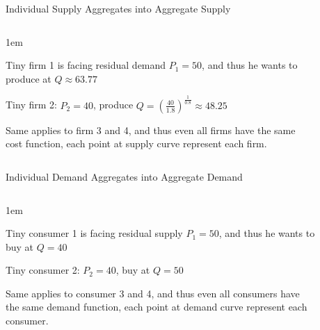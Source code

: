 \documentclass[11pt,aspectratio=43,usenames,dvipsnames]{beamer}
\let\olditemize=\itemize
\let\endolditemize=\enditemize
\renewenvironment{itemize}{\olditemize \itemsep1em}{\endolditemize}
\theoremstyle{definition}
\begin{document}
\begin{frame}{Individual Supply Aggregates into Aggregate Supply}
\label{slide:Individual_Supply_Aggregation_into_Aggregate_Supply}
    \begin{columns}
        \begin{column}{0.45\textwidth}
            \begin{itemize}
                \item \alert{Tiny} firm 1 is facing residual demand $ P_{1} = 50 $, and thus he wants to produce at $ Q \approx 63.77 $
                \item \alert{Tiny} firm 2: $ P_{2} = 40$, produce $Q = ( \frac{40}{1.8} )^{ \frac{1}{0.8}} \approx 48.25$
                \item Same applies to firm 3 and 4, and thus even all firms have the same cost function, \alert{each point at supply curve represent each firm}.
            \end{itemize}

        \end{column}
        \begin{column}{0.6\textwidth}
            \begin{figure}
                \centering
                
            \end{figure}
        \end{column}
    \end{columns}

\end{frame}

\begin{frame}{Individual Demand Aggregates into Aggregate Demand}
\label{slide:Individual_Demand_Aggregates_into_Aggregate_Demand}
    \begin{columns}
        \begin{column}{0.45\textwidth}
            \begin{itemize}
                \item \alert{Tiny} \alert{consumer} 1 is facing residual supply $ P_{1} = 50 $, and thus he wants to buy at $ Q = 40$
                \item \alert{Tiny} consumer 2: $ P_{2} = 40$, buy at $Q = 50$
                \item Same applies to consumer 3 and 4, and thus even all consumers have the same demand function, \alert{each point at demand curve represent each consumer}.
            \end{itemize}

        \end{column}
        \begin{column}{0.6\textwidth}
            \begin{figure}
                \centering
                
            \end{figure}
        \end{column}
    \end{columns}

\end{frame}
\end{document}
